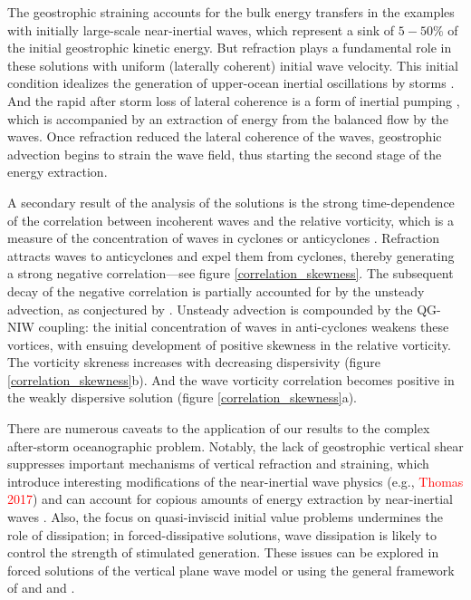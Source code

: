 \documentclass{jfm}
\newcommand{\NIW}{near-inertial wave}
\begin{document}
 The geostrophic straining accounts for the bulk energy transfers in the examples
with initially large-scale \NIW s, which represent a sink of
$5-50\%$ of the initial geostrophic kinetic energy. But refraction plays a fundamental role
in these solutions with uniform (laterally coherent) initial wave velocity.
 This initial condition idealizes the
generation of upper-ocean inertial oscillations by storms
\citep[e.g., ][]{danioux_etal2015,moehlis_llewellynsmith2001}. And the rapid after
storm loss of lateral coherence is a form of inertial pumping
 \citep{young_benjelloul1997,klein_etal2004}, which
 is accompanied by an extraction of energy from the balanced flow by the waves.
Once refraction reduced the lateral coherence of the waves, geostrophic advection
begins to strain the wave field, thus starting the second stage of the energy
extraction.

A secondary result of the analysis of the solutions
is the strong time-dependence of the correlation between incoherent waves and
the relative vorticity, which is a measure of the concentration of waves in cyclones or
anticyclones \citep{danioux_etal2015}. Refraction attracts waves to anticyclones
and expel them from cyclones, thereby generating a strong negative correlation---see
figure \eqref{correlation_skewness}.
The subsequent decay of the negative correlation is partially accounted
for by the unsteady advection, as conjectured by \cite{danioux_etal2015}. Unsteady
advection is compounded by the QG-NIW coupling: the initial concentration of
waves in anti-cyclones weakens these vortices, with ensuing development of positive
skewness in the relative vorticity. The vorticity skreness increases with decreasing
dispersivity (figure \eqref{correlation_skewness}b). And the wave vorticity
correlation becomes positive in the weakly dispersive solution
(figure \eqref{correlation_skewness}a).

There are numerous caveats to the application of our results to the complex
after-storm oceanographic problem. Notably, the lack of geostrophic
vertical shear suppresses important mechanisms of vertical refraction and
straining, which introduce interesting modifications of the near-inertial wave
physics (e.g., \textcolor{red}{Thomas 2017}) and can account for copious amounts
of energy extraction by near-inertial waves \citep{shakespeare_hogg2017}. Also,
the focus on quasi-inviscid initial value problems undermines the role of
dissipation; in forced-dissipative solutions, wave dissipation is likely to control
the strength of stimulated generation. These issues can be explored in forced solutions
of the vertical plane wave model or using the general framework of \cite{xie_vanneste2015}
and \cite{salmon2016} and \cite{wagner_young2016}.
\end{document}
